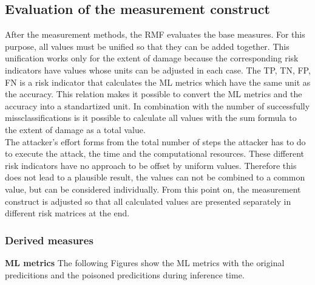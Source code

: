 \subsection{Evaluation of the measurement construct}

After the measurement methods, the RMF evaluates the base measures. For this purpose, all values must be unified so that they can be added together. This unification works only for the extent of damage because the corresponding risk indicators have values whose units can be adjusted in each case. The TP, TN, FP, FN is a risk indicator that calculates the ML metrics which have the same unit as the accuracy. This relation makes it possible to convert the ML metrics and the accuracy into a standartized unit. In combination with the number of successfully missclassifications is it possible to calculate all values with the sum formula to the extent of damage as a total value. \\
The attacker's effort forms from the total number of steps the attacker has to do to execute the attack, the time and the computational resources. These different risk indicators have no approach to be offset by uniform values. Therefore this does not lead to a plausible result, the values can not be combined to a common value, but can be considered individually. From this point on, the measurement construct is adjusted so that all calculated values are presented separately in different risk matrices at the end.

\subsubsection*{Derived measures}

\textbf{ML metrics} The following Figures show the ML metrics with the original predicitions and the poisoned predicitions during inference time.


